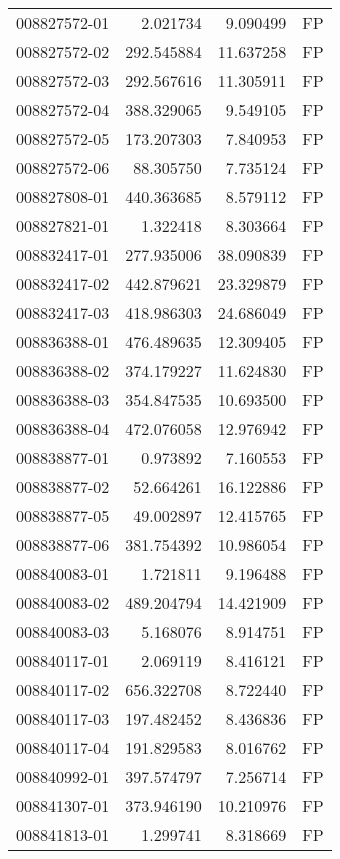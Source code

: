 \begin{tabular}{lrrl}
008827572-01 &    2.021734 &     9.090499 &   FP \\
008827572-02 &  292.545884 &    11.637258 &   FP \\
008827572-03 &  292.567616 &    11.305911 &   FP \\
008827572-04 &  388.329065 &     9.549105 &   FP \\
008827572-05 &  173.207303 &     7.840953 &   FP \\
008827572-06 &   88.305750 &     7.735124 &   FP \\
008827808-01 &  440.363685 &     8.579112 &   FP \\
008827821-01 &    1.322418 &     8.303664 &   FP \\
008832417-01 &  277.935006 &    38.090839 &   FP \\
008832417-02 &  442.879621 &    23.329879 &   FP \\
008832417-03 &  418.986303 &    24.686049 &   FP \\
008836388-01 &  476.489635 &    12.309405 &   FP \\
008836388-02 &  374.179227 &    11.624830 &   FP \\
008836388-03 &  354.847535 &    10.693500 &   FP \\
008836388-04 &  472.076058 &    12.976942 &   FP \\
008838877-01 &    0.973892 &     7.160553 &   FP \\
008838877-02 &   52.664261 &    16.122886 &   FP \\
008838877-05 &   49.002897 &    12.415765 &   FP \\
008838877-06 &  381.754392 &    10.986054 &   FP \\
008840083-01 &    1.721811 &     9.196488 &   FP \\
008840083-02 &  489.204794 &    14.421909 &   FP \\
008840083-03 &    5.168076 &     8.914751 &   FP \\
008840117-01 &    2.069119 &     8.416121 &   FP \\
008840117-02 &  656.322708 &     8.722440 &   FP \\
008840117-03 &  197.482452 &     8.436836 &   FP \\
008840117-04 &  191.829583 &     8.016762 &   FP \\
008840992-01 &  397.574797 &     7.256714 &   FP \\
008841307-01 &  373.946190 &    10.210976 &   FP \\
008841813-01 &    1.299741 &     8.318669 &   FP \\

\end{tabular}
